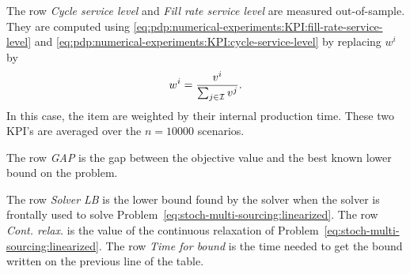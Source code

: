 The row \emph{Cycle service level} and \emph{Fill rate service level} are measured out-of-sample.
They are computed using \cref{eq:pdp:numerical-experiments:KPI:fill-rate-service-level} and \cref{eq:pdp:numerical-experiments:KPI:cycle-service-level} by replacing $w^i$ by
\begin{equation}\label{eq:multi-sourcing:numerical-experiments:KPI:weight}
  w^i=\frac{v^i}{\sum_{j\in\mathcal{I}}v^j}.
\end{equation}
In this case, the item are weighted by their internal production time.
These two KPI's are averaged over the $n=10000$ scenarios.


The row \emph{GAP} is the gap between the objective value and the best known lower bound on the problem.


The row \emph{Solver LB} is the lower bound found by the solver when the solver is frontally used to solve Problem~\eqref{eq:stoch-multi-sourcing:linearized}.
The row \emph{Cont. relax.} is the value of the continuous relaxation of Problem~\eqref{eq:stoch-multi-sourcing:linearized}.
The row \emph{Time for bound} is the time needed to get the bound written on the previous line of the table.


